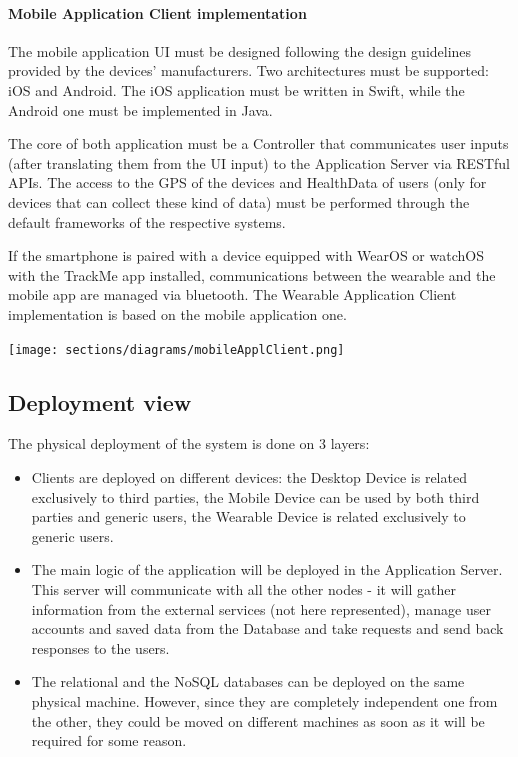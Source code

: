 \paragraph{Mobile Application Client implementation}
The mobile application UI must be designed following the design guidelines provided by the devices’ manufacturers. Two architectures must be supported: iOS and Android. The iOS application must be written in Swift, while the Android one must be implemented in Java.

The core of both application must be a Controller that communicates user inputs (after translating them from the UI input) to the Application Server via RESTful APIs. The access to the GPS of the devices and HealthData of users (only for devices that can collect these kind of data) must be performed through the default frameworks of the respective systems.

If the smartphone is paired with a device equipped with WearOS or watchOS with the TrackMe app installed, communications between the wearable and the mobile app are managed via bluetooth. The Wearable Application Client implementation is based on the mobile application one.

\begin{center}
\texttt{[image: sections/diagrams/mobileApplClient.png]}
\newline
{}
\end{center}

\subsection{Deployment view}
The physical deployment of the system is done on 3 layers:
\begin{itemize}
\item Clients are deployed on different devices: the Desktop Device is related exclusively to third parties, the Mobile Device can be used by both third parties and generic users, the Wearable Device is related exclusively to generic users.

\item  The main logic of the application will be deployed in the Application Server. This server will communicate with all the other nodes - it will gather information from the external services (not here represented), manage user accounts and saved data from the Database and take requests and send back responses to the users.

\item The relational and the NoSQL databases can be deployed on the same physical machine. However, since they are completely independent one from the other, they could be moved on different machines as soon as it will be required for some reason.
\end{itemize}

